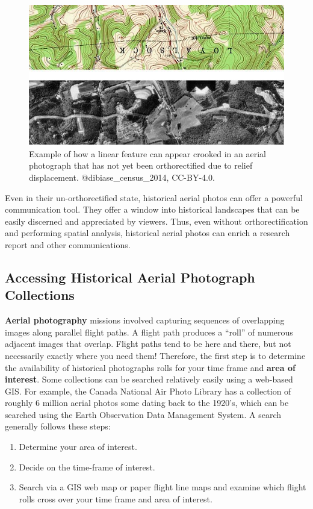 \documentclass[
]{book}
\providecommand{\tightlist}{%
  \setlength{\itemsep}{0pt}\setlength{\parskip}{0pt}}
\begin{document}
\begin{figure}
\includegraphics[width=0.75\linewidth]{images/04-crooked-aerialphoto} \caption{Example of how a linear feature can appear crooked in an aerial photograph that has not yet been orthorectified due to relief displacement. @dibiase_census_2014, CC-BY-4.0.}\label{fig:4-crooked-aerialphoto}
\end{figure}

Even in their un-orthorectified state, historical aerial photos can offer a powerful communication tool. They offer a window into historical landscapes that can be easily discerned and appreciated by viewers. Thus, even without orthorectification and performing spatial analysis, historical aerial photos can enrich a research report and other communications.

\hypertarget{accessing-historical-aerial-photograph-collections}{%
\subsection{Accessing Historical Aerial Photograph Collections}\label{accessing-historical-aerial-photograph-collections}}

\textbf{Aerial photography} missions involved capturing sequences of overlapping images along parallel flight paths. A flight path produces a ``roll'' of numerous adjacent images that overlap. Flight paths tend to be here and there, but not necessarily exactly where you need them! Therefore, the first step is to determine the availability of historical photographs rolls for your time frame and \textbf{area of interest}. Some collections can be searched relatively easily using a web-based GIS. For example, the Canada National Air Photo Library has a collection of roughly 6 million aerial photos some dating back to the 1920's, which can be searched using the Earth Observation Data Management System. A search generally follows these steps:

\begin{enumerate}
\def\labelenumi{\arabic{enumi}.}
\tightlist
\item
  Determine your area of interest.
\item
  Decide on the time-frame of interest.
\item
  Search via a GIS web map or paper flight line maps and examine which flight rolls cross over your time frame and area of interest.
\end{enumerate}
\end{document}
